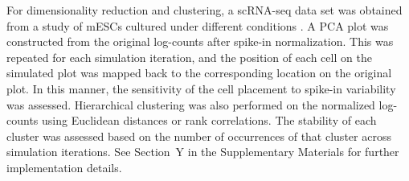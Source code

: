 \documentclass{article}
\begin{document}
For dimensionality reduction and clustering, a scRNA-seq data set was obtained from a study of mESCs cultured under different conditions \cite{kolod2015single}.
A PCA plot was constructed from the original log-counts after spike-in normalization.
This was repeated for each simulation iteration, and the position of each cell on the simulated plot was mapped back to the corresponding location on the original plot.
In this manner, the sensitivity of the cell placement to spike-in variability was assessed.
Hierarchical clustering was also performed on the normalized log-counts using Euclidean distances or rank correlations.
The stability of each cluster was assessed based on the number of occurrences of that cluster across simulation iterations.
See Section~Y in the Supplementary Materials for further implementation details.

{\small


}
\end{document}

